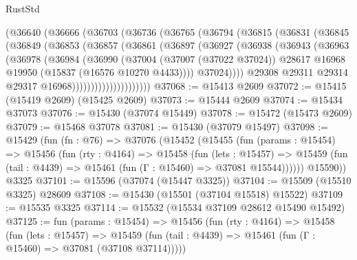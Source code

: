 \begin{lexlean}{RustStd}
\begin{coremodule}
{\begin{coremodule}
{{{{{{{{{{{{{{{{{{{{{{{{{{{{{{{{{{{{{{{{{{{{{{{{{{{{{{{{{{{{              (@36640
                (@36666
                  (@36703
                    (@36736
                      (@36765
                        (@36794
                          (@36815
                            (@36831
                              (@36845
                                (@36849
                                  (@36853
                                    (@36857
                                      (@36861
                                        (@36897
                                          (@36927
                                            (@36938
                                              (@36943
                                                (@36963
                                                  (@36978
                                                    (@36984
                                                      (@36990
                                                        (@37004
                                                          (@37007 (@37022 @37024))
                                                          @28617
                                                          @16968
                                                          @19950
                                                          (@15837 (@16576 @10270 @4433))))
                                                      @37024))))
                                              @29308
                                              @29311
                                              @29314
                                              @29317
                                              @16968)))))))))))))))))))))
@37068 := @15413 @2609
@37072 := @15415 (@15419 @2609) (@15425 @2609)
@37073 := @15444 @2609
@37074 := @15434 @37073
@37076 := @15430 (@37074 @15449)
@37078 := @15472 (@15473 @2609)
@37079 := @15468 @37078
@37081 := @15430 (@37079 @15497)
@37098 := @15429
    (fun (fn : @76) =>
    @37076
      (@15452
        (@15455
          (fun (params : @15454) =>
          @15456
            (fun (rty : @4164) =>
            @15458
              (fun (lets : @15457) =>
              @15459 (fun (tail : @4439) => @15461 (fun (Γ : @15460) => @37081 @15544))))))
        @15590))
    @3325
@37101 := @15596 (@37074 (@15447 @3325))
@37104 := @15509 (@15510 @3325) @28609
@37108 := @15430 (@15501 (@37104 @15518) @15522)
@37109 := @15535 @3325
@37114 := @15532 (@15534 @37109 @28612 @15490 @15492)
@37125 := fun (params : @15454) =>
  @15456
    (fun (rty : @4164) =>
    @15458
      (fun (lets : @15457) =>
      @15459 (fun (tail : @4439) => @15461 (fun (Γ : @15460) => @37081 (@37108 @37114)))))
}}}}}}}}}}}}}}}}}}}}}}}}}}}}}}}}}}}}}}}}}}}}}}}}}}}}}}}}}}}}
\end{coremodule}}
\end{coremodule}
\end{lexlean}
